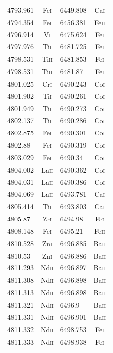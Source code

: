 \begin{longtable}[c]{|l|c|l|c|}
4793.961 & Fe\textsc{i} & 6449.808 & Ca\textsc{i}\\  
4794.354 & Fe\textsc{i} & 6456.381 & Fe\textsc{ii}\\ 
4796.914 & V\textsc{i} & 6475.624 & Fe\textsc{i}\\   
4797.976 & Ti\textsc{i} & 6481.725 & Fe\textsc{i}\\  
4798.531 & Ti\textsc{ii} & 6481.853 & Fe\textsc{i}\\ 
4798.531 & Ti\textsc{ii} & 6481.87 & Fe\textsc{i}\\  
4801.025 & Cr\textsc{i} & 6490.243 & Co\textsc{i}\\  
4801.902 & Ti\textsc{i} & 6490.261 & Co\textsc{i}\\  
4801.949 & Ti\textsc{i} & 6490.273 & Co\textsc{i}\\  
4802.137 & Ti\textsc{i} & 6490.286 & Co\textsc{i}\\  
4802.875 & Fe\textsc{i} & 6490.301 & Co\textsc{i}\\  
4802.88 & Fe\textsc{i} & 6490.319 & Co\textsc{i}\\   
4803.029 & Fe\textsc{i} & 6490.34 & Co\textsc{i}\\   
4804.002 & La\textsc{ii} & 6490.362 & Co\textsc{i}\\ 
4804.031 & La\textsc{ii} & 6490.386 & Co\textsc{i}\\ 
4804.069 & La\textsc{ii} & 6493.781 & Ca\textsc{i}\\ 
4805.414 & Ti\textsc{i} & 6493.803 & Ca\textsc{i}\\  
4805.87 & Zr\textsc{i} & 6494.98 & Fe\textsc{i}\\    
4808.148 & Fe\textsc{i} & 6495.21 & Fe\textsc{ii}\\  
4810.528 & Zn\textsc{i} & 6496.885 & Ba\textsc{ii}\\ 
4810.53 & Zn\textsc{i} & 6496.886 & Ba\textsc{ii}\\  
4811.293 & Nd\textsc{ii} & 6496.897 & Ba\textsc{ii}\\
4811.308 & Nd\textsc{ii} & 6496.898 & Ba\textsc{ii}\\
4811.313 & Nd\textsc{ii} & 6496.898 & Ba\textsc{ii}\\
4811.321 & Nd\textsc{ii} & 6496.9 & Ba\textsc{ii}\\  
4811.331 & Nd\textsc{ii} & 6496.901 & Ba\textsc{ii}\\
4811.332 & Nd\textsc{ii} & 6498.753 & Fe\textsc{i}\\ 
4811.333 & Nd\textsc{ii} & 6498.938 & Fe\textsc{i}\\ 

\end{longtable}
